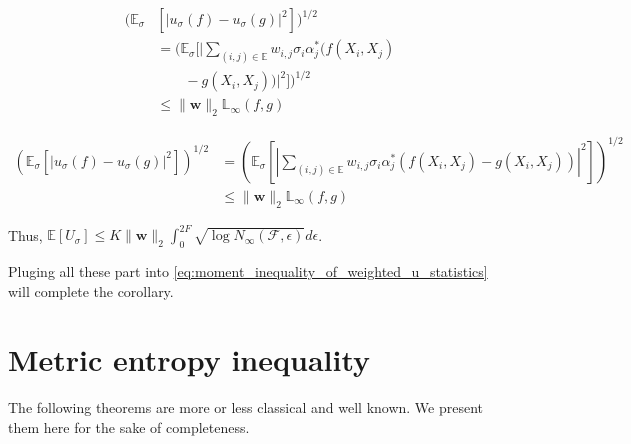 \documentclass[letterpaper]{article} %
\def\DoubleColumn{}
\def\DoubleColumnEnd{}
\def\SingleColumn{}
\def\SingleColumnEnd{}
\newcommand{\E}{\mathbb{E}}
\newcommand{\weight}{\mathbf{w}}
\newcommand{\rademacher}{\sigma}
\newcommand{\pair}[1]{(#1)}
\newcommand{\lebesgue}{\mathbb{L}}
\begin{document}
\DoubleColumn
\begin{align*}
    (\E_\rademacher&[|u_\rademacher(f)-u_\rademacher(g)|^2])^{1/2}\\
    &=(\E_\rademacher[|\sum_{\pair{i,j}\in\E}w_{i,j}\rademacher_i\alpha_j^*(f(X_i,X_j)\\
    &\qquad-g(X_i,X_j))|^2])^{1/2}\\
    &\le \|\weight{}\|_2\lebesgue_\infty(f,g)
\end{align*}
\DoubleColumnEnd 
\SingleColumn
\begin{align*}
    (\E_\rademacher[|u_\rademacher(f)-u_\rademacher(g)|^2])^{1/2}&=(\E_\rademacher[|\sum_{\pair{i,j}\in\E}w_{i,j}\rademacher_i\alpha_j^*(f(X_i,X_j)-g(X_i,X_j))|^2])^{1/2}\\
    &\le \|\weight{}\|_2\lebesgue_\infty(f,g)
\end{align*}
\SingleColumnEnd
Thus, $\E[U_\rademacher]\le K\|\weight{}\|_2\int_0^{2F}\sqrt{\log N_\infty(\mathcal F,\epsilon)}d\epsilon$.

Pluging all these part into \eqref{eq:moment_inequality_of_weighted_u_statistics} will complete the corollary.
\section{Metric entropy inequality} %
\label{sub:metric_entropy_inequality}

The following theorems are more or less classical and well known. We present them here for the sake of completeness.
\end{document}

